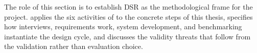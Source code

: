 The role of this section is to establish DSR as the methodological frame for the project.  applies the six activities of \textcite{peffers2007dsrm} to the concrete steps of this thesis, specifies how interviews, requirements work, system development, and benchmarking instantiate the design cycle, and discusses the validity threats that follow from the validation rather than evaluation choice.